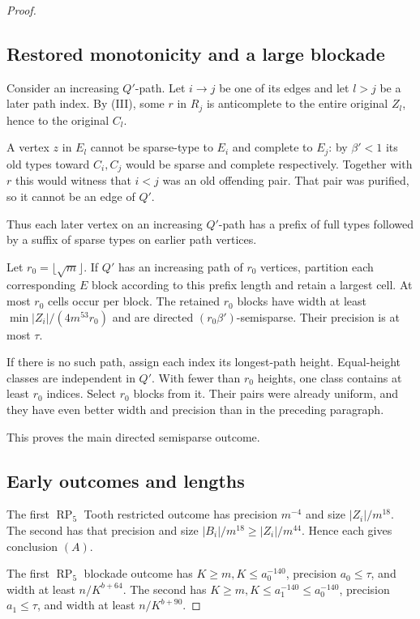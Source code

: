 \documentclass[11pt,a4paper]{article}
\theoremstyle{definition}
\theoremstyle{remark}
\numberwithin{equation}{section}
\begin{document}
\begin{proof}
\subsection{Restored monotonicity and a large blockade}\label{subsec:rp6-monotonicity}
Consider an increasing \(Q'\)-path. Let \(i\to j\) be one of its edges and let \(l>j\) be a later path index. By (III), some \(r\) in \(R_{j}\) is anticomplete to the entire original \(Z_{l}\), hence to the original \(C_{l}\).

A vertex \(z\) in \(E_{l}\) cannot be sparse-type to \(E_{i}\) and complete to \(E_{j}\): by \(\beta'<1\) its old types toward \(C_{i},\allowbreak C_{j}\) would be sparse and complete respectively. Together with \(r\) this would witness that \(i<j\) was an old offending pair. That pair was purified, so it cannot be an edge of \(Q'\).

Thus each later vertex on an increasing \(Q'\)-path has a prefix of full types followed by a suffix of sparse types on earlier path vertices.

Let \(r_{0}=\lfloor \sqrt{m}\rfloor\). If \(Q'\) has an increasing path of \(r_{0}\) vertices, partition each corresponding \(E\) block according to this prefix length and retain a largest cell. At most \(r_{0}\) cells occur per block. The retained \(r_{0}\) blocks have width at least \(\min  |Z_{i}|/(4m^{53} r_{0})\) and are directed \((r_{0} \beta')\)-semisparse. Their precision is at most \(\tau\).

If there is no such path, assign each index its longest-path height. Equal-height classes are independent in \(Q'\). With fewer than \(r_{0}\) heights, one class contains at least \(r_{0}\) indices. Select \(r_{0}\) blocks from it. Their pairs were already uniform, and they have even better width and precision than in the preceding paragraph.

This proves the main directed semisparse outcome.
\subsection{Early outcomes and lengths}\label{subsec:rp6-early}
The first \(\operatorname{RP}_{5}\) Tooth restricted outcome has precision \(m^{-4}\) and size \(|Z_{i}|/m^{18}\). The second has that precision and size \(|B_{i}|/m^{18}\ge\allowbreak |Z_{i}|/m^{44}\). Hence each gives conclusion \((A)\).

The first \(\operatorname{RP}_{5}\) blockade outcome has \(K\ge\allowbreak m,\allowbreak  K\le\allowbreak a_{0}^{-140}\), precision \(a_{0}\le\allowbreak \tau\), and width at least \(n/K^{b+64}\). The second has \(K\ge\allowbreak m,\allowbreak  K\le\allowbreak a_{1}^{-140}\le\allowbreak a_{0}^{-140}\), precision \(a_{1}\le\allowbreak \tau\), and width at least \(n/K^{b+90}\).


\end{proof}
\end{document}
